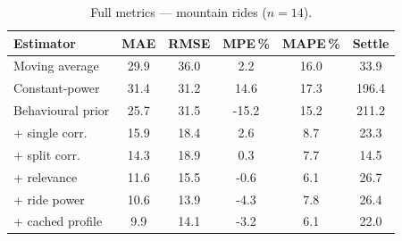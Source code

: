 \documentclass[11pt,a4paper]{article}
\begin{document}
\begin{table}[ht]
\centering
\caption{Full metrics --- mountain rides ($n = 14$).}
\label{tab:full-mtn}
\begin{tabular}{@{} l S[table-format=2.1] S[table-format=2.1] S[table-format=3.1] S[table-format=2.1] S[table-format=3.1] @{}}
\toprule
Estimator & {MAE} & {RMSE} & {MPE\,\%} & {MAPE\,\%} & {Settle} \\
\midrule
Moving average    & 29.9 & 36.0 & 2.2    & 16.0 & 33.9  \\
Constant-power    & 31.4 & 31.2 & 14.6   & 17.3 & 196.4 \\
Behavioural prior & 25.7 & 31.5 & -15.2  & 15.2 & 211.2 \\
+ single corr.    & 15.9 & 18.4 & 2.6    & 8.7  & 23.3  \\
+ split corr.     & 14.3 & 18.9 & 0.3    & 7.7  & 14.5  \\
+ relevance       & 11.6 & 15.5 & -0.6   & 6.1  & 26.7  \\
+ ride power       & 10.6 & 13.9 & -4.3   & 7.8  & 26.4  \\
\cmidrule(lr){1-6}
+ cached profile  & 9.9  & 14.1 & -3.2   & 6.1  & 22.0  \\
\bottomrule
\end{tabular}
\end{table}
\end{document}
